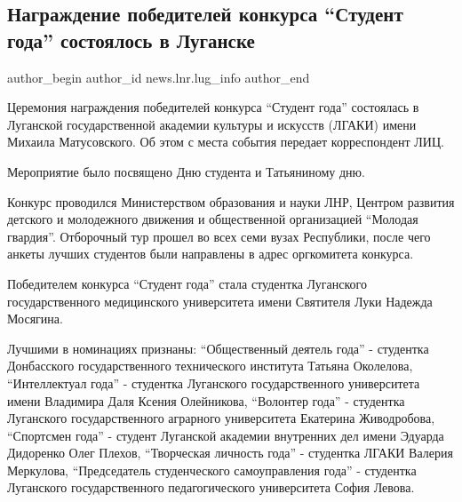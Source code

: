 
 
 
 
 
 
\subsection{Награждение победителей конкурса \enquote{Студент года} состоялось в Луганске}
\label{sec:25_01_2022.stz.news.lnr.lug_info.2.student_goda}
 
\ifcmt
 author_begin
   author_id news.lnr.lug_info
 author_end
\fi

Церемония награждения победителей конкурса \enquote{Студент года} состоялась в
Луганской государственной академии культуры и искусств (ЛГАКИ) имени Михаила
Матусовского. Об этом с места события передает корреспондент ЛИЦ.

Мероприятие было посвящено Дню студента и Татьяниному дню.


Конкурс проводился Министерством образования и науки ЛНР, Центром развития
детского и молодежного движения и общественной организацией \enquote{Молодая гвардия}.
Отборочный тур прошел во всех семи вузах Республики, после чего анкеты лучших
студентов были направлены в адрес оргкомитета конкурса.


Победителем конкурса \enquote{Студент года} стала студентка Луганского государственного
медицинского университета имени Святителя Луки Надежда Мосягина.


Лучшими в номинациях признаны: \enquote{Общественный деятель года} - студентка
Донбасского государственного технического института Татьяна Околелова,
\enquote{Интеллектуал года} - студентка Луганского государственного университета имени
Владимира Даля Ксения Олейникова, \enquote{Волонтер года} - студентка Луганского
государственного аграрного университета Екатерина Живодробова, \enquote{Спортсмен года}
- студент Луганской академии внутренних дел имени Эдуарда Дидоренко Олег
Плехов, \enquote{Творческая личность года} - студентка ЛГАКИ Валерия Меркулова,
\enquote{Председатель студенческого самоуправления года} - студентка Луганского
государственного педагогического университета София Левова.   

